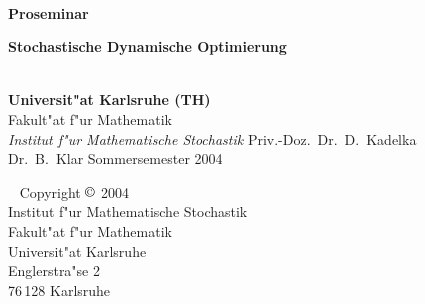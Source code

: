 \usepackage{epsf,amsthm,amsmath}
\usepackage[ngerman]{babel}
\usepackage[latin1]{inputenc}
\usepackage{graphicx}
\setlength{\parskip}{5pt plus 8pt minus 2pt}
\pagestyle{headings}


\begin{titlepage}
\ \vfill
\Large
\begin{center}
{\LARGE\bf Proseminar} \\[1cm]
{\huge\bf Stochastische Dynamische Optimierung\par}
\vspace*{1cm}

\\[1cm]
{\bf Universit"at Karlsruhe (TH)}\\
{Fakult"at f"ur Mathematik}\\
{\em Institut f"ur Mathematische Stochastik}
\vfill
Priv.-Doz.~Dr.~D.~Kadelka\\
Dr.~B.~Klar
\vfill\vfill 
Sommersemester 2004
\vfill
\vfill
\end{center}
\end{titlepage} 
\thispagestyle{empty}
\ 
\vfill
\noindent
Copyright $\copyright$ 2004\\
Institut f"ur Mathematische Stochastik\\
Fakult"at f"ur Mathematik\\
Universit"at Karlsruhe\\
Englerstra"se 2\\
76\,128 Karlsruhe

